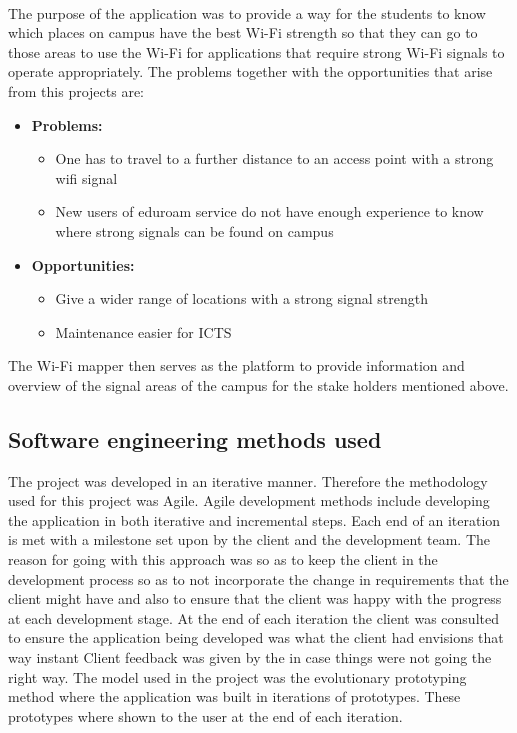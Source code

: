 \paragraph{} 
The purpose of the application was to provide a way for the students to know which places on campus have the best Wi-Fi strength so that they can go to those areas to use the Wi-Fi for applications that require strong Wi-Fi signals to operate appropriately. The problems together with the opportunities that arise from this projects are:
\begin{itemize}
	\item \textbf{Problems:}
	\begin{itemize}
		\item One has to travel to a further distance to an access point with a strong wifi signal
		\item New users of eduroam service do not have enough experience to know where strong
		signals can be found on campus
	\end{itemize}
	\item  \textbf{Opportunities:}
	\begin{itemize}
		\item  Give a wider range of locations with a strong signal strength
		\item Maintenance easier for ICTS
	\end{itemize}
\end{itemize} 
The Wi-Fi mapper then serves as the platform to provide information and overview of the signal areas of the campus for the stake holders mentioned above.
\subsection*{Software engineering methods used}
The project was developed in an iterative manner. Therefore the methodology used for this project was Agile. Agile development methods include developing the application in both iterative and incremental steps. Each end of an iteration is met with a milestone set upon by the client and the development team. The reason for going with this approach  was so as to keep the client in the development process so as to not incorporate the change in requirements that the client might have and also to ensure that the client was happy with the progress at each development stage. At the end of each iteration the client was consulted to ensure the application being developed was what the client had envisions that way instant Client feedback was given by the in case things were not going the right way. The model used in the project was the evolutionary prototyping method where the application was built in iterations of prototypes. These prototypes where shown to the user at the end of each iteration.

